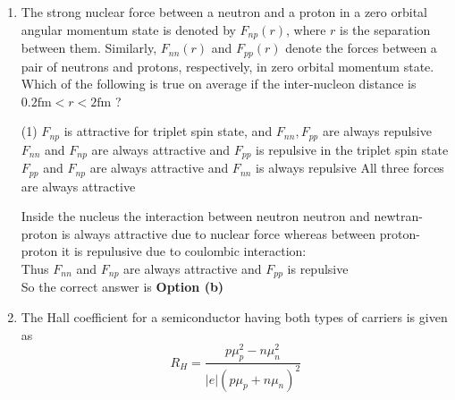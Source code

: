 \begin{enumerate}
\begin{tasks}
	\task[\textbf{c.}]An eigenstate of $\hat{x}$ corresponding to the eigenvalue $(x-a)$
	\task[\textbf{d.}]Not an eigenstate of $\hat{x}$	
\end{tasks}
\begin{answer}
	\begin{align*}
	&e^{\frac{i a P}{\hbar}}|x\rangle\\
	&=\left[\sum_{n=0}^{\infty} \frac{1}{\lfloor n}\left(\frac{i a P}{\hbar}\right)^{n}\right]|x\rangle=\left[\sum_{n=0}^{\infty} \frac{1}{\lfloor n}(-a \nabla)^{n}\right]^{h}|x\rangle \\
	&=|x\rangle-a \vec{\nabla}|x\rangle+\frac{1}{\lfloor 2}(a \vec{\nabla})^{2}|x\rangle \ldots .=|x-a\rangle \\
	X|x-a\rangle&=(x-a)|x-a\rangle
	\end{align*}
		So the correct answer is \textbf{Option (c)}
\end{answer}
\item The strong nuclear force between a neutron and a proton in a zero orbital angular momentum state is denoted by $F_{n p}(r)$, where $r$ is the separation between them. Similarly, $F_{n n}(r)$ and $F_{p p}(r)$ denote the forces between a pair of neutrons and protons, respectively, in zero orbital momentum state. Which of the following is true on average if the inter-nucleon distance is $0.2 \mathrm{fm}<r<2 \mathrm{fm}$ ?
 \begin{tasks}(1)
	\task[\textbf{a.}]$F_{n p}$ is attractive for triplet spin state, and $F_{n n}, F_{p p}$ are always repulsive
	\task[\textbf{b.}]$F_{n n}$ and $F_{n p}$ are always attractive and $F_{p p}$ is repulsive in the triplet spin state
	\task[\textbf{c.}] $F_{p p}$ and $F_{n p}$ are always attractive and $F_{n n}$ is always repulsive
	\task[\textbf{d.}] All three forces are always attractive
\end{tasks}
\begin{answer}
	Inside the nucleus the interaction between neutron neutron and newtran-proton is always attractive due to nuclear force whereas between proton-proton it is repulusive due to coulombic interaction:\\
	Thus $F_{n n}$ and $F_{n p}$ are always attractive and $F_{p p}$ is repulsive\\
	So the correct answer is \textbf{Option (b)}
\end{answer}
\item The Hall coefficient for a semiconductor having both types of carriers is given as
$$
R_{H}=\frac{p \mu_{p}^{2}-n \mu_{n}^{2}}{|e|\left(p \mu_{p}+n \mu_{n}\right)^{2}}
$$
\end{enumerate}
